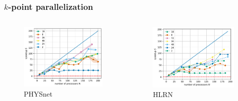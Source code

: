 \documentclass[aspectratio=169]{beamer}
\begin{document}
\begin{frame}
	\frametitle{\(k\)-point parallelization}
	
	\begin{columns}
		\begin{column}{0.5\textwidth}
			\begin{figure}
				\includegraphics[width=\textwidth]{figs/TaS2_intel_bench_nk_speedup.pdf}
				\caption*{PHYSnet}
			\end{figure}
		\end{column}

		\begin{column}{0.5\textwidth}
			\begin{figure}
				\includegraphics[width=\textwidth]{figs/TaS2_hlrn_bench_nk_speedup.pdf}
				\caption*{HLRN}
			\end{figure}
		\end{column}
	\end{columns}

\end{frame}
\end{document}
